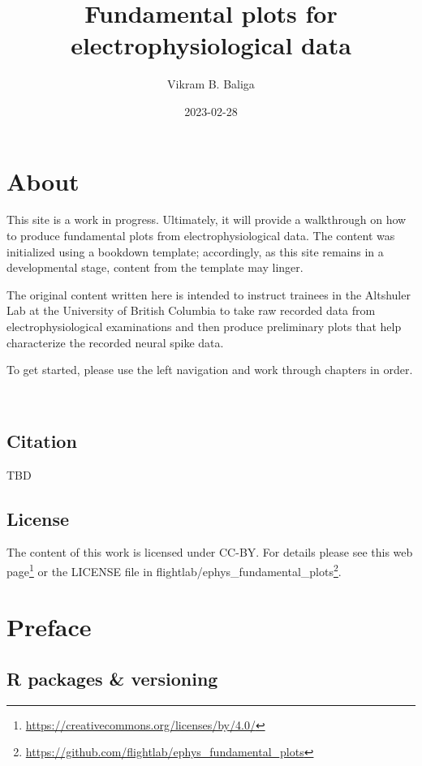 \documentclass[
]{book}
\title{Fundamental plots for electrophysiological data}
\author{Vikram B. Baliga}
\date{2023-02-28}
\DeclareRobustCommand{\href}[2]{#2\footnote{\url{#1}}}
\begin{document}
\maketitle

{
\setcounter{tocdepth}{1}
\tableofcontents
}
\hypertarget{about}{%
\chapter{About}\label{about}}

This site is a work in progress. Ultimately, it will provide a walkthrough on how to produce fundamental plots from electrophysiological data. The content was initialized using a bookdown template; accordingly, as this site remains in a developmental stage, content from the template may linger.

The original content written here is intended to instruct trainees in the Altshuler Lab at the University of British Columbia to take raw recorded data from electrophysiological examinations and then produce preliminary plots that help characterize the recorded neural spike data.

To get started, please use the left navigation and work through chapters in order.

🐢

\hypertarget{citation}{%
\section*{Citation}\label{citation}}

TBD

\hypertarget{license}{%
\section*{License}\label{license}}

The content of this work is licensed under CC-BY. For details please see \href{https://creativecommons.org/licenses/by/4.0/}{this web page} or the LICENSE file in \href{https://github.com/flightlab/ephys_fundamental_plots}{flightlab/ephys\_fundamental\_plots}.

\hypertarget{preface}{%
\chapter{Preface}\label{preface}}

\hypertarget{r-packages-versioning}{%
\section{R packages \& versioning}\label{r-packages-versioning}}
\end{document}
